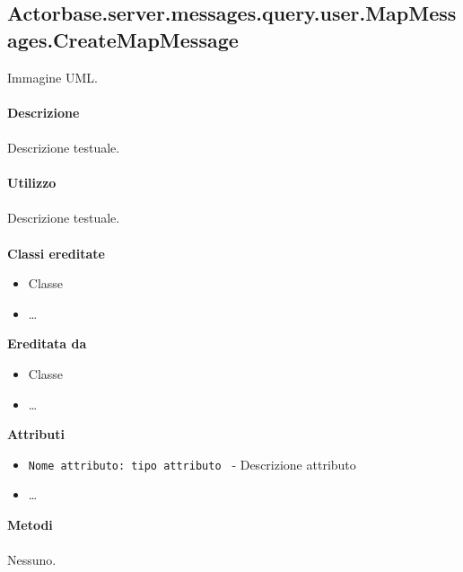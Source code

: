 \documentclass[a4paper]{article}
\begin{document}
	\subsection{Actorbase.server.messages.query.user.MapMessages.CreateMapMessage}
		Immagine UML.
		\\ \\
		\textbf{Descrizione}
			\\ \\
			Descrizione testuale.
			\\ \\
		\textbf{Utilizzo}
			\\ \\
			Descrizione testuale.
			\\ \\
		\textbf{Classi ereditate}
			\begin{itemize}
				\item Classe
				\item \dots
			\end{itemize}
		\textbf{Ereditata da}
			\begin{itemize}
				\item Classe
				\item \dots
			\end{itemize}
		\textbf{Attributi}
			\begin{itemize}
				\item \texttt{Nome attributo: tipo attributo } - Descrizione attributo
				\item \dots
			\end{itemize}
		\textbf{Metodi}
			\\ \\
			Nessuno.
			
\end{document}
